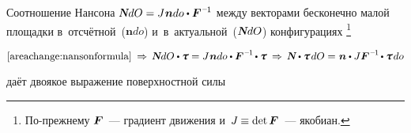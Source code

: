 \newpage



\label{para:piolakirchhoffstresstensor}

\begin{otherlanguage}{russian}

Соотношение Нансона ${\mathboldN dO = J \hspace{.1ex} \bm{n} do \dotp \bm{F}^{\hspace{.1ex}\expminusone} \hspace{-0.1ex}}$ между векторами бесконечно малой площадки в~отсчётной~(${\bm{n} do}$) и~в~актуальной~(${\mathboldN dO}$) конфигурациях%
\footnote{По\hbox{-}прежнему ${\bm{F}\hspace{-0.12ex}}$~--- градиент движения и~${J \hspace{-0.1ex} \equiv \operatorname{det} \bm{F}\hspace{-0.12ex}}$~--- якобиан.}

\nopagebreak\vspace{-0.12em}\begin{equation*}
\eqref{areachange:nansonformula} \:\Rightarrow\,
\mathboldN dO \dotp \cauchystress = J \hspace{.1ex} \bm{n} do \dotp \bm{F}^{\hspace{.1ex}\expminusone} \hspace{-0.2ex} \dotp \cauchystress
\:\Rightarrow\,
\mathboldN \dotp \cauchystress \hspace{.25ex} dO = \hspace{.1ex} \bm{n} \dotp J \bm{F}^{\hspace{.1ex}\expminusone} \hspace{-0.2ex} \dotp \cauchystress \hspace{.2ex} do
\end{equation*}


\vspace{-0.2em} \noindent даёт двоякое выражение поверхностной силы


\end{otherlanguage}
